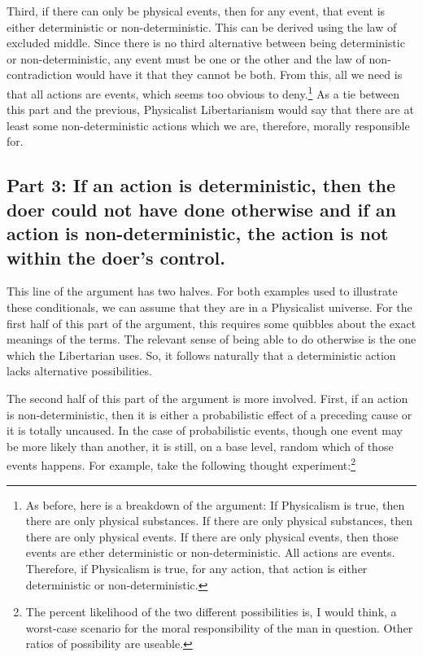 Third, if there can only be physical events, then for any event, that event is either deterministic or non-deterministic. This can be derived using the law of excluded middle. Since there is no third alternative between being deterministic or non-deterministic, any event must be one or the other and the law of non-contradiction would have it that they cannot be both. From this, all we need is that all actions are events, which seems too obvious to deny.\footnote{As before, here is a breakdown of the argument: If Physicalism is true, then there are only physical substances. If there are only physical substances, then there are only physical events. If there are only physical events, then those events are ether deterministic or non-deterministic. All actions are events. Therefore, if Physicalism is true, for any action, that action is either deterministic or non-deterministic.} As a tie between this part and the previous, Physicalist Libertarianism would say that there are at least some non-deterministic actions which we are, therefore, morally responsible for.  
\subsection{Part 3: If an action is deterministic, then the doer could not have done otherwise and if an action is non-deterministic, the action is not within the doer’s control.}

This line of the argument has two halves. For both examples used to illustrate these conditionals, we can assume that they are in a Physicalist universe. For the first half of this part of the argument, this requires some quibbles about the exact meanings of the terms. The relevant sense of being able to do otherwise is the one which the Libertarian uses. So, it follows naturally that a deterministic action lacks alternative possibilities.

The second half of this part of the argument is more involved. First, if an action is non-deterministic, then it is either a probabilistic effect of a preceding cause or it is totally uncaused. In the case of probabilistic events, though one event may be more likely than another, it is still, on a base level, random which of those events happens. For example, take the following thought experiment:\footnote{The percent likelihood of the two different possibilities is, I would think, a worst-case scenario for the moral responsibility of the man in question. Other ratios of possibility are useable.}


